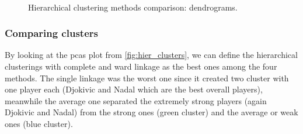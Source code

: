 \begin{figure}[H]
    \centering
    \\
    \caption{Hierarchical clustering methods comparison: dendrograms.}
    \label{fig:hier_dendograms}
\end{figure}

\subsubsection{Comparing clusters}
By looking at the pcas plot from \autoref{fig:hier_clusters}, we can define the hierarchical clusterings with complete and ward linkage as the best ones among the four methods. The single linkage was the worst one since it created two cluster with one player each (Djokivic and Nadal which are the best overall players), meanwhile the average one separated the extremely strong players (again Djokivic and Nadal) from the strong ones (green cluster) and the average or weak ones (blue cluster).
\vspace{3mm}

